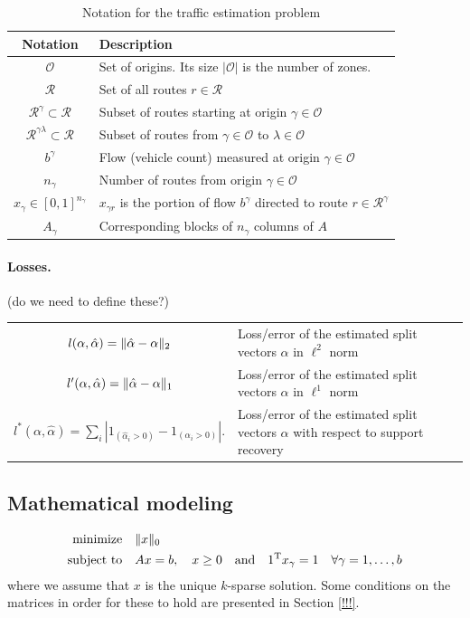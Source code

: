 \documentclass{article} %
\newcommand{\OO}{\mathcal{O}}
\newcommand{\RR}{\mathcal{R}}
\begin{document}
\begin{table}[htbp]
\caption{Notation for the traffic estimation problem}
\label{tab-notation}
\centering
\begin{tabular}{cl}
\toprule
Notation & Description \\
\midrule
$\OO$ & Set of origins. Its size $|\OO|$ is the number of zones. \\
$\RR$ & Set of all routes $r\in \RR$\\
$\RR^\gamma \subset\RR$ & Subset of routes starting at origin $\gamma\in\OO$ \\
$\RR^{\gamma \lambda} \subset\RR$ & Subset of routes from $\gamma\in\OO$ to $\lambda\in \OO$ \\
$b^\gamma$ & Flow (vehicle count) measured at origin $\gamma\in\OO$ \\
$n_\gamma$ & Number of routes from origin $\gamma\in \OO$\\
$x_\gamma \in[0, 1]^{n_\gamma}$ & $x_{\gamma r}$ is the portion of flow $b^\gamma$ directed to route $r \in \RR^\gamma$ \\
$A_{\gamma}$ & Corresponding blocks of $n_{\gamma}$ columns of $A$\\
\bottomrule
\end{tabular}
\end{table}

\paragraph{Losses.} (do we need to define these?)

\begin{tabular}{cl}
$l(\alpha, \hat\alpha) = \lVert\hat\alpha - \alpha\rVert_2$ & Loss/error of the estimated split vectors $\alpha$ in $\ell^2$ norm \\
$l'(\alpha, \hat\alpha) = \lVert\hat\alpha - \alpha\rVert_1$ & Loss/error of the estimated split vectors $\alpha$ in $\ell^1$ norm \\
$l^*(\alpha, \hat \alpha) = \sum_{i}|1_{(\hat{\alpha}_i > 0)} - 1_{(\alpha_i > 0)}|.$ & Loss/error of the estimated split vectors $\alpha$ with respect to support recovery
\end{tabular}

\subsection{Mathematical modeling}
\begin{equation}\label{l0-minimization}
  \begin{split}
    \text{minimize} &\quad \lVert x\rVert_0\\
    \text{subject to} &\quad Ax = b,\quad x\geq 0\quad \text{and}\quad 1^{\rm T} x_{\gamma} = 1\quad \forall \gamma=1,\dots, b
  \end{split}
\end{equation}
where we assume that $x$ is the unique $k$-sparse solution. Some conditions on the matrices in order for these to hold are presented in Section \ref{!!!}.
\end{document}
